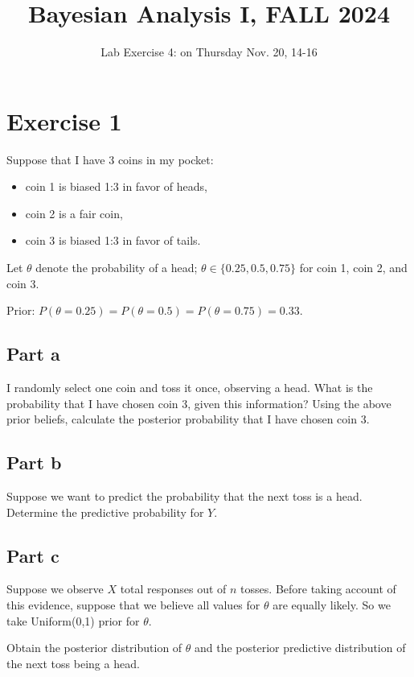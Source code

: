\documentclass{article}
\begin{document}
\title{Bayesian Analysis I, FALL 2024}
\author{Lab Exercise 4: on Thursday Nov. 20, 14-16}
\date{}

\maketitle

\section{Exercise 1}

Suppose that I have 3 coins in my pocket:
\begin{itemize}
    \item coin 1 is biased 1:3 in favor of heads,
    \item coin 2 is a fair coin,
    \item coin 3 is biased 1:3 in favor of tails.
\end{itemize}

Let $\theta$ denote the probability of a head; $\theta \in \{0.25, 0.5, 0.75\}$ for coin 1, coin 2, and coin 3.

Prior: $P(\theta = 0.25) = P(\theta = 0.5) = P(\theta = 0.75) = 0.33$.

\subsection{Part a}
I randomly select one coin and toss it once, observing a head. What is the probability that I have chosen coin 3, given this information? Using the above prior beliefs, calculate the posterior probability that I have chosen coin 3. 

\subsection{Part b}
Suppose we want to predict the probability that the next toss is a head. Determine the predictive probability for $Y$.

\subsection{Part c}
Suppose we observe $X$ total responses out of $n$ tosses. Before taking account of this evidence, suppose that we believe all values for $\theta$ are equally likely. So we take Uniform(0,1) prior for $\theta$.

Obtain the posterior distribution of $\theta$ and the posterior predictive distribution of the next toss being a head.
\end{document}
